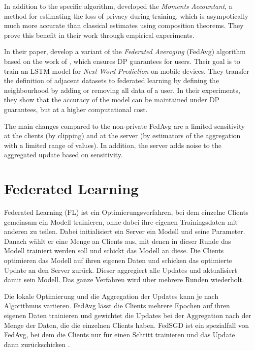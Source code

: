 In addition to the specific algorithm, \textcite{abadi:2016} developed the \textit{Moments Accountant}, a method for estimating the loss of privacy during training, which is asympotically much more accurate than classical estimates using composition theorems. They prove this benefit in their work through empirical experiments.

In their paper, \textcite{mcmahan:2018} develop a variant of the \textit{Federated Averaging} (FedAvg) algorithm \parencite{mcmahan:2016} based on the work of \textcite{abadi:2016}, which ensures DP guarantees for users. Their goal is to train an LSTM model for \textit{Next-Word Prediction} on mobile devices. They transfer the definition of adjacent datasets to federated learning by defining the neighbourhood by adding or removing all data of a user. In their experiments, they show that the accuracy of the model can be maintained under DP guarantees, but at a higher computational cost.

The main changes compared to the non-private FedAvg are a limited sensitivity at the clients (by clipping) and at the server (by estimators of the aggregation with a limited range of values). In addition, the server adds noise to the aggregated update based on sensitivity.

\section{Federated Learning}

Federated Learning (FL) ist ein Optimierungsverfahren, bei dem einzelne Clients gemeinsam ein Modell trainieren, ohne dabei ihre eigenen Trainingsdaten mit anderen zu teilen. Dabei initialisiert ein Server ein Modell und seine Parameter. Danach wählt er eine Menge an Clients aus, mit denen in dieser Runde das Modell trainiert werden soll und schickt das Modell an diese. Die Clients optimieren das Modell auf ihren eigenen Daten und schicken das optimierte Update an den Server zurück. Dieser aggregiert alle Updates und aktualisiert damit sein Modell. Das ganze Verfahren wird über mehrere Runden wiederholt. 

Die lokale Optimierung und die Aggregation der Updates kann je nach Algorithmus variieren. FedAvg lässt die Clients mehrere Epochen auf ihren eigenen Daten trainieren und gewichtet die Updates bei der Aggregation nach der Menge der Daten, die die einzelnen Clients haben. FedSGD ist ein spezialfall von FedAvg, bei dem die Clients nur für einen Schritt trainieren und das Update dann zurückschicken \parencite{mcmahan:2016}. 


